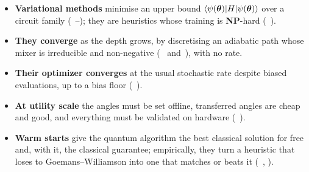 \documentclass[handoutsbeamer.tex]{subfiles}
\begin{document}
\begin{frame}
\onp{\footnotesize}
\begin{itemize}\setlength\itemsep{0.4em}
    \item \textbf{Variational methods} minimise an upper bound $\braket{\psi(\boldsymbol\theta)|H|\psi(\boldsymbol\theta)}$ over a circuit family (\Chaps~--); they are heuristics whose training is \textbf{NP}-hard (\Chap~).
    \item \textbf{They converge} as the depth grows, by discretising an adiabatic path whose mixer is irreducible and non-negative (\Chaps~ and~), with no rate.
    \item \textbf{Their optimizer converges} at the usual stochastic rate despite biased evaluations, up to a bias floor (\Chap~).
    \item \textbf{At utility scale} the angles must be set offline, transferred angles are cheap and good, and everything must be validated on hardware (\Chap~).
    \item \textbf{Warm starts} give the quantum algorithm the best classical solution for free and, with it, the classical guarantee; empirically, they turn a heuristic that loses to Goemans--Williamson into one that matches or beats it (\Chaps~, ).
\end{itemize}
\end{frame}


\begin{frame}[allowframebreaks]
\biblio
\end{frame}
\end{document}
